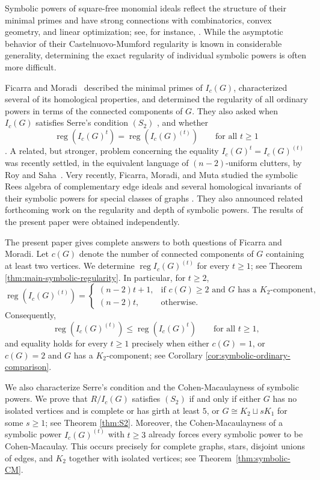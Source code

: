 \documentclass[12pt]{amsart}
\DeclareMathOperator{\reg}{reg}
\begin{document}
Symbolic powers of square-free monomial ideals reflect the structure of their minimal primes and have strong connections with combinatorics, convex geometry, and linear optimization; see, for instance, \cite{MontanoNunez21, HT}. While the asymptotic behavior of their Castelnuovo-Mumford regularity is known in considerable generality,
determining the exact regularity of individual symbolic powers is often more difficult.

Ficarra and Moradi~\cite{fm25} described the minimal primes of \(I_c(G)\), characterized several of its homological properties, and determined the regularity of all ordinary powers in terms of the connected components of \(G\). They also asked when \(I_c(G)\) satisfies Serre's condition \((S_2)\) \cite[Question~2.9]{fm25}, and whether
\[
\reg(I_c(G)^t)=\reg(I_c(G)^{(t)})
\qquad\text{for all }t\geq1
\]
\cite[Question~4.11]{fm25}. A related, but stronger, problem concerning the equality \(I_c(G)^t=I_c(G)^{(t)}\) was recently settled, in the equivalent language of \((n-2)\)-uniform clutters, by Roy and Saha~\cite{RS25}. Very recently, Ficarra, Moradi, and Muta studied the symbolic Rees algebra of complementary edge ideals and several homological invariants of their symbolic powers for special classes of graphs \cite{FicarraMoradiMuta}. They also announced related forthcoming work on the regularity and depth of symbolic powers. The results of the present paper were obtained independently.

The present paper gives complete answers to both questions of Ficarra and Moradi. Let \(c(G)\) denote the number of connected components of \(G\) containing at least two vertices. We determine \(\reg I_c(G)^{(t)}\) for every \(t\geq1\); see Theorem \ref{thm:main-symbolic-regularity}. In particular, for \(t\geq2\),
\[
\reg(I_c(G)^{(t)})
=
\begin{cases}
(n-2)t+1,
& \text{if \(c(G)\geq2\) and \(G\) has a \(K_2\)-component},\\
(n-2)t,
& \text{otherwise}.
\end{cases}
\]
Consequently,
\[
\reg(I_c(G)^{(t)}) \leq \reg(I_c(G)^t)
\qquad\text{for all }t\geq1,
\]
and equality holds for every \(t\geq1\) precisely when either \(c(G)=1\), or \(c(G)=2\) and \(G\) has a \(K_2\)-component; see Corollary \ref{cor:symbolic-ordinary-comparison}.

We also characterize Serre's condition and the Cohen-Macaulayness of symbolic powers. We prove that \(R/I_c(G)\) satisfies \((S_2)\) if and only if either \(G\) has no isolated vertices and is complete or has girth at least \(5\), or \(G\cong K_2\sqcup sK_1\) for some \(s\geq1\); see Theorem \ref{thm:S2}. Moreover, the Cohen-Macaulayness of a symbolic power $I_c(G)^{(t)}$ with \(t \geq 3\) already forces every symbolic power to be Cohen-Macaulay. This occurs precisely for complete graphs, stars, disjoint unions of edges, and \(K_2\) together with isolated vertices; see Theorem~\ref{thm:symbolic-CM}.
\end{document}
